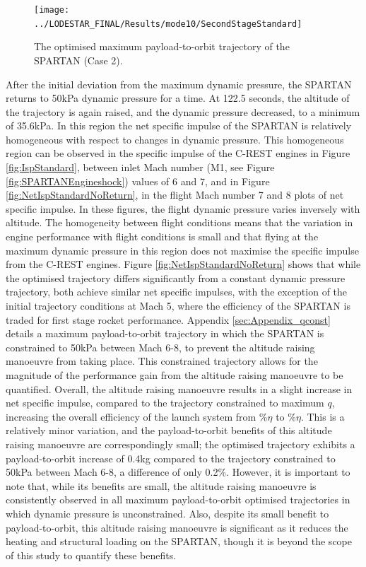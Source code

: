 \begin{figure}[ht!]
\centering
\texttt{[image: ../LODESTAR\_FINAL/Results/mode10/SecondStageStandard]}
\caption{The optimised maximum payload-to-orbit trajectory of the SPARTAN (Case 2).}
\label{fig:SecondStageStandardNoReturn}
\end{figure}



After the initial deviation from the maximum dynamic pressure, the SPARTAN returns to 50kPa dynamic pressure for a time. 
At 122.5 seconds, the altitude of the trajectory is again raised, and the dynamic pressure decreased, to a minimum of 35.6kPa. In this region the net specific impulse of the SPARTAN is relatively homogeneous with respect to changes in dynamic pressure. This homogeneous region can be observed in the specific impulse of the C-REST engines in Figure \ref{fig:IspStandard}, between inlet Mach number (M1, see Figure \ref{fig:SPARTANEngineshock}) values of 6 and 7, and in Figure \ref{fig:NetIspStandardNoReturn}, in the flight Mach number 7 and 8 plots of net specific impulse. In these figures, the flight dynamic pressure varies inversely with altitude. The homogeneity between flight conditions means that the variation in engine performance with flight conditions is small and that flying at the maximum dynamic pressure in this region does not maximise the specific impulse from the C-REST engines. Figure \ref{fig:NetIspStandardNoReturn} shows that while the optimised trajectory differs significantly from a constant dynamic pressure trajectory, both achieve similar net specific impulses, with the exception of the initial trajectory conditions at Mach 5, where the efficiency of the SPARTAN is traded for first stage rocket performance. 
Appendix \ref{sec:Appendix_qconst} details a maximum payload-to-orbit trajectory in which the SPARTAN is constrained to 50kPa between Mach 6-8, to prevent the altitude raising manoeuvre from taking place. This constrained trajectory allows for the magnitude of the performance gain from the altitude raising manoeuvre to be quantified. 
Overall, the altitude raising manoeuvre results in a slight increase in net specific impulse, compared to the trajectory constrained to maximum $q$, increasing the overall efficiency of the launch system from \totalExergyEffqconstrainedNoReturn \%$\eta$ to \totalExergyEffStandardNoReturn\%$\eta$. This is a relatively minor variation, and the payload-to-orbit benefits of this altitude raising manoeuvre are correspondingly small; 
the optimised trajectory exhibits a payload-to-orbit increase of 0.4kg compared to the trajectory constrained to 50kPa between Mach 6-8, a difference of only 0.2\%.
However, it is important to note that, while its benefits are small, the altitude raising manoeuvre is consistently observed in all maximum payload-to-orbit optimised trajectories in which dynamic pressure is unconstrained. 
Also, despite its small benefit to payload-to-orbit, this altitude raising manoeuvre is significant as it reduces the heating and structural loading on the SPARTAN, though it is beyond the scope of this study to quantify these benefits. 




